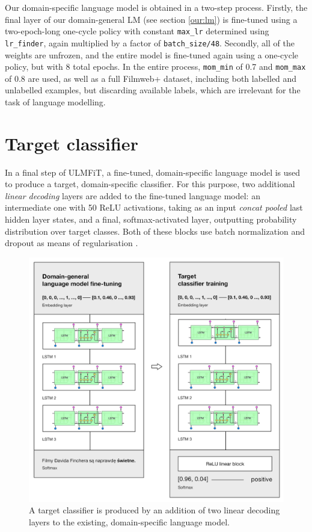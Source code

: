 Our domain-specific language model is obtained in a two-step process. Firstly, the final layer of our domain-general LM (see section \ref{our:lm}) is fine-tuned using a two-epoch-long one-cycle policy with constant \lstinline{max_lr} determined using \lstinline{lr_finder}, again multiplied by a factor of \lstinline{batch_size/48}. Secondly, all of the weights are unfrozen, and the entire model is fine-tuned again using a one-cycle policy, but with 8 total epochs. In the entire process, \lstinline{mom_min} of 0.7 and \lstinline{mom_max} of 0.8 are used, as well as a full Filmweb+ dataset, including both labelled and unlabelled examples, but discarding available labels, which are irrelevant for the task of language modelling.

\section{Target classifier}

In a final step of ULMFiT, a fine-tuned, domain-specific language model is used to produce a target, domain-specific classifier. For this purpose, two additional \emph{linear decoding} layers are added to the fine-tuned language model: an intermediate one with 50 ReLU activations, taking as an input \emph{concat pooled} last hidden layer states, and a final, softmax-activated layer, outputting probability distribution over target classes. Both of these blocks use batch normalization \cite{szegedy:batchnormalization} and dropout as means of regularisation \cite{ulmfit}.

\begin{figure}[]
\centering
\includegraphics[scale=0.9]{figures/ulmfit_tc.png}
\caption{A target classifier is produced by an addition of two linear decoding layers to the existing, domain-specific language model.} 
\label{ulmfit:classifier}
\end{figure}

